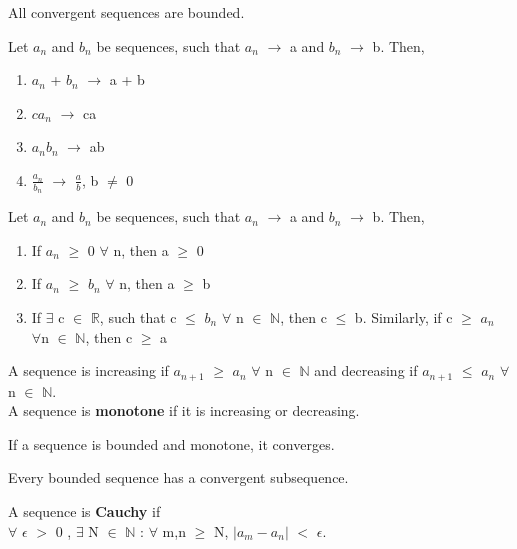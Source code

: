 \documentclass{report}
\begin{document}
\begin{theorem}
All convergent sequences are bounded.
\end{theorem}

\begin{theorem}
Let $a_n$ and $b_n$ be sequences, such that $a_n$ $\rightarrow$ a and $b_n$ $\rightarrow$ b. Then,
\begin{enumerate}
\item $a_n$ + $b_n$ $\rightarrow$ a + b
\item $ca_n$ $\rightarrow$ ca
\item $a_n b_n$ $\rightarrow$ ab
\item $\frac{a_n}{b_n}$ $\rightarrow$ $\frac{a}{b}$, b $\neq$ 0
\end{enumerate}
\end{theorem}

\begin{theorem}
Let $a_n$ and $b_n$ be sequences, such that $a_n$ $\rightarrow$ a and $b_n$ $\rightarrow$ b. Then,
\begin{enumerate}
\item If $a_n$ $\geq$ 0 $\forall$ n, then a $\geq$ 0
\item If $a_n$ $\geq$ $b_n$ $\forall$ n, then a $\geq$ b
\item If $\exists$ c $\in$ $\mathbb{R}$, such that c $\leq$ $b_n$ $\forall$ n $\in$ $\mathbb{N}$, then c $\leq$ b. Similarly, if c $\geq$ $a_n$ \\ $\forall$n $\in$ $\mathbb{N}$, then c $\geq$ a
\end{enumerate}
\end{theorem}
\begin{definition}
A sequence is increasing if $a_{n+1}$ $\geq$ $a_n$ $\forall$ n $\in$ $\mathbb{N}$ and decreasing if  $a_{n+1}$ $\leq$ $a_n$ $\forall$ n $\in$ $\mathbb{N}$. \\
A sequence is \textbf{monotone} if it is increasing or decreasing.
\end{definition}

\begin{theorem}
If a sequence is bounded and monotone, it converges.
\end{theorem}

\begin{theorem}
Every bounded sequence has a convergent subsequence.
\end{theorem}

\begin{definition}
A sequence is \textbf{Cauchy} if\\
$\forall$ $\epsilon$ $>$ 0 , $\exists$ N $\in$ $\mathbb{N}$ : $\forall$ m,n $\geq$ N, $\lvert a_m - a_n \rvert$ $<$ $\epsilon$.
\end{definition}
\end{document}
